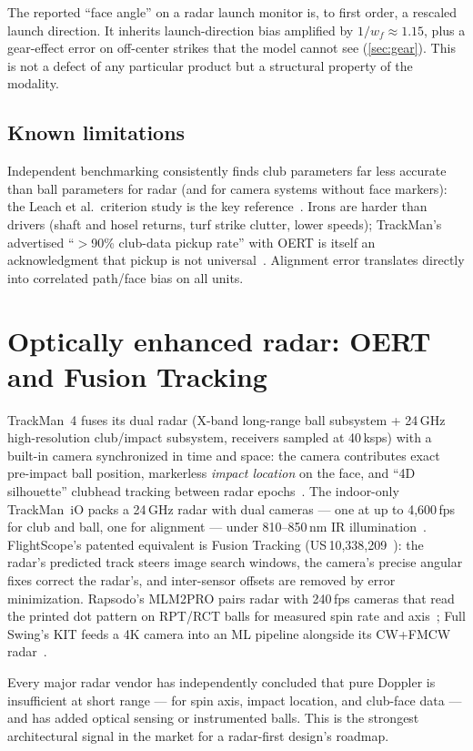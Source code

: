 \begin{keypoint}
The reported ``face angle'' on a radar launch monitor is, to first order,
a rescaled launch direction. It inherits launch-direction bias amplified
by $1/w_f\approx1.15$, plus a gear-effect error on off-center strikes
that the model cannot see (\cref{sec:gear}). This is not a defect of any
particular product but a structural property of the modality.
\end{keypoint}

\subsection{Known limitations}

Independent benchmarking consistently finds club parameters far less
accurate than ball parameters for radar (and for camera systems without
face markers): the Leach et al.\ criterion study is the key
reference~\cite{leach2017}. Irons are harder than drivers (shaft and hosel
returns, turf strike clutter, lower speeds); TrackMan's advertised
``$>$90\% club-data pickup rate'' with OERT is itself an acknowledgment
that pickup is not universal~\cite{trackmanoert}. Alignment error
translates directly into correlated path/face bias on all units.

\section{Optically enhanced radar: OERT and Fusion Tracking}
\label{sec:oert}

TrackMan~4 fuses its dual radar (X-band long-range ball subsystem +
24\,GHz high-resolution club/impact subsystem, receivers sampled at
40\,ksps) with a built-in camera synchronized in time and space: the
camera contributes exact pre-impact ball position, markerless
\emph{impact location} on the face, and ``4D silhouette'' clubhead
tracking between radar epochs~\cite{trackmanoert,fccTman4}. The
indoor-only TrackMan~iO packs a 24\,GHz radar with dual cameras --- one at
up to 4,600\,fps for club and ball, one for alignment --- under 810--850\,nm
IR illumination~\cite{trackmanspecs}. FlightScope's patented equivalent is
Fusion Tracking (US\,10,338,209~\cite{us10338209}): the radar's predicted
track steers image search windows, the camera's precise angular fixes
correct the radar's, and inter-sensor offsets are removed by error
minimization. Rapsodo's MLM2PRO pairs radar with 240\,fps cameras that
read the printed dot pattern on RPT/RCT balls for measured spin rate and
axis~\cite{mygolfspymlm2pro}; Full Swing's KIT feeds a 4K camera into an
ML pipeline alongside its CW+FMCW radar~\cite{fullswingkit}.

\begin{keypoint}
Every major radar vendor has independently concluded that pure Doppler is
insufficient at short range --- for spin axis, impact location, and
club-face data --- and has added optical sensing or instrumented balls.
This is the strongest architectural signal in the market for a radar-first design's
roadmap.
\end{keypoint}

